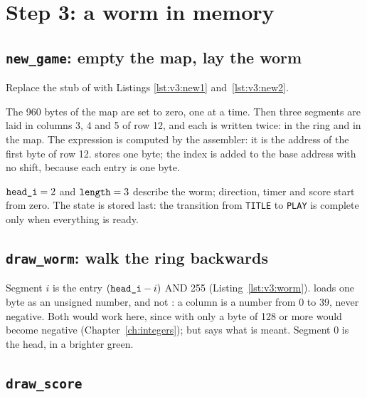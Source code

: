 \section{Step 3: a worm in memory}

\subsection{\texttt{new\_game}: empty the map, lay the worm}

Replace the stub of  with Listings \ref{lst:v3:new1}
and~\ref{lst:v3:new2}.


The 960 bytes of the map are set to zero, one  at a time. Then three
segments are laid in columns 3, 4 and 5 of row 12, and each is written twice:
in the ring and in the map. The expression  is computed by
the assembler: it is the address of the first byte of row 12. 
stores one byte; the index is added to the base address with no shift,
because each entry is one byte.


$\texttt{head\_i}=2$ and $\texttt{length}=3$ describe the worm; direction, timer
and score start from zero. The state is stored last: the transition from
\texttt{TITLE} to \texttt{PLAY} is complete only when everything is ready.

\subsection{\texttt{draw\_worm}: walk the ring backwards}


Segment $i$ is the entry $(\texttt{head\_i}-i)$ AND 255
(Listing~\ref{lst:v3:worm}).  loads one byte as an unsigned number,
and not : a column is a number from 0 to 39, never negative. Both
would work here, since with  only a byte of 128 or more would become
negative (Chapter~\ref{ch:integers}); but  says what is meant.
Segment 0 is the head, in a brighter green.

\subsection{\texttt{draw\_score}}

